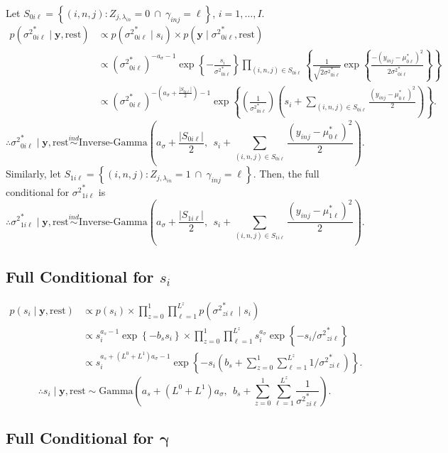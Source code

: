 \documentclass[12pt]{article}
\newcommand{\p}[1]{\left(#1\right)}
\newcommand{\bc}[1]{ \left\{#1\right\} }
\newcommand{\abs}[1]{ \left|#1\right| }
\newcommand{\ind}{\overset{ind}{\sim}}
\def\G{\text{Gamma}}
\def\IG{\text{Inverse-Gamma}}
\def\lin{\lambda_{in}}
\def\y{\bm{y}}
\def\mus{\mu^*}
\def\sss{{\sigma^2}^*}
\def\rest{\text{rest}}
\begin{document}
Let
$S_{0i\ell} = \bc{(i, n,j): Z_{j,\lin} = 0 ~\cap~ \gamma_{inj}=\ell}$,
$i=1, \ldots, I$.
\begin{align*}
p(\sss_{0i\ell} \mid \y, \rest) &\propto p(\sss_{0i\ell} \mid s_i) \times p(\y \mid \sss_{0i\ell}, \rest) \\
&\propto (\sss_{0i\ell})^{-a_\sigma-1} \exp\bc{-\frac{s_i}{\sss_{0i\ell}}} 
\prod_{(i,n,j)\in S_{0i\ell}} \bc{
  \frac{1}{\sqrt{2\sss_{0i\ell}}}
  \exp\bc{\frac{-(y_{inj}-\mus_{0\ell})^2}{2\sss_{0i\ell}}}
} \\
&\propto (\sss_{0i\ell})^{-(a_\sigma + \frac{\abs{S_{0i\ell}}}{2})-1}
\exp\bc{\p{\frac{1}{\sss_{0i\ell}}}\p{s_i + \sum_{(i,n,j)\in S_{0i\ell}}
\frac{(y_{inj}-\mus_{0\ell})^2}{2}
}}.
\end{align*}
%
$$
\therefore \sss_{0i\ell} \mid \y, \rest \ind
\IG\p{a_\sigma + \frac{\abs{S_{0i\ell}}}{2}, ~~ s_i + \sum_{(i,n,j)\in S_{0i\ell}}
\frac{(y_{inj}-\mus_{0\ell})^2}{2}
}.
$$
%
Similarly, let
$S_{1i\ell} = \bc{(i, n,j): Z_{j,\lin} = 1 ~\cap~ \gamma_{inj}=\ell}$.
Then, the full conditional for $\sss_{1i\ell}$ is $$
\therefore \sss_{1i\ell} \mid \y, \rest \ind
\IG\p{a_\sigma + \frac{\abs{S_{1i\ell}}}{2}, ~~ s_i + \sum_{(i,n,j)\in S_{1i\ell}}
\frac{(y_{inj}-\mus_{1\ell})^2}{2}
}.
$$

\subsection{\texorpdfstring{Full Conditional for
$s_i$}{Full Conditional for s\_i}}\label{full-conditional-for-s_i}
%
\begin{align*}
p(s_i \mid \y, \rest) &\propto p(s_i) \times \prod_{z=0}^1 \prod_{\ell=1}^{L^z} p(\sss_{zi\ell} \mid s_i)\\
&\propto s_i^{a_s-1} \exp\bc{-b_s s_i} \times \prod_{z=0}^1  \prod_{\ell=1}^{L^z} s_i^{a_\sigma} \exp\bc{-s_i / \sss_{zi\ell}} \\
&\propto s_i^{a_s + (L^0 + L^1)a_\sigma - 1} \exp\bc{-s_i \p{b_s + \sum_{z=0}^1 \sum_{\ell=1}^{L^z} 1 / \sss_{zi\ell}}}.
\end{align*}
%
$$
\therefore s_i \mid \y, \rest \sim 
\G\p{a_s + (L^0 + L^1)a_\sigma, ~~ b_s + \sum_{z=0}^1 \sum_{\ell=1}^{L^z} \frac{1}{\sss_{zi\ell}} }.
$$
%
\subsection{\texorpdfstring{Full Conditional for
$\bm\gamma$}{Full Conditional for \textbackslash{}bm\textbackslash{}gamma}}\label{full-conditional-for-bmgamma}
\end{document}
